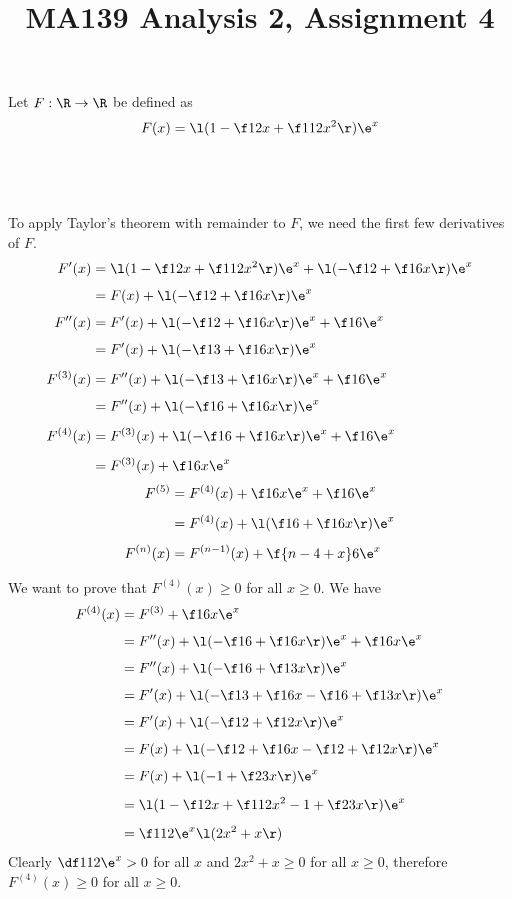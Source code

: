 \documentclass[a4paper]{article}
\title{MA139 Analysis 2, Assignment 4}
\begin{document}
\maketitle

\setlength{\parindent}{0em}
\setlength{\parskip}{1em}


Let $F : \R \to \R$ be defined as $$F(x) = \l( 1 - \f12 x + \f1{12} x^2 \r) \e^x$$

\subsection{~}

To apply Taylor's theorem with remainder to $F$, we need the first few derivatives of $F$. \begin{align*}
F'(x) &= \l( 1 - \f12 x + \f1{12} x^2 \r) \e^x + \l( - \f12 + \f16 x \r) \e^x\\[1ex]
&= F(x) + \l( - \f12 + \f16 x \r) \e^x\\[1ex]
F''(x) &= F'(x) + \l( - \f12 + \f16 x \r) \e^x + \f16 \e^x\\[1ex]
&= F'(x) + \l( - \f13 + \f16 x \r) \e^x\\[1ex]
F^{(3)}(x) &= F''(x) + \l( - \f13 + \f16 x \r) \e^x + \f16 \e^x\\[1ex]
&= F''(x) + \l( - \f16 + \f16 x \r) \e^x\\[1ex]
F^{(4)}(x) &= F^{(3)}(x) + \l( - \f16 + \f16 x \r) \e^x + \f16 \e^x\\[1ex]
&= F^{(3)}(x) + \f16 x \e^x
\end{align*}
\begin{align*}
F^{(5)} &= F^{(4)}(x) + \f16 x \e^x + \f16 \e^x\\[1ex]
&= F^{(4)}(x) + \l( \f16 + \f16 x \r) \e^x\\[1ex]
F^{(n)}(x) &= F^{(n-1)}(x) + \f{n - 4 + x}6 \e^x
\end{align*}

We want to prove that $F^{(4)}(x) \ge 0$ for all $x \ge 0$. We have \begin{align*}
F^{(4)}(x) &= F^{(3)} + \f16 x \e^x\\[1ex]
&= F''(x) + \l( - \f16 + \f16 x \r) \e^x + \f16 x \e^x\\[1ex]
&= F''(x) + \l( - \f16 + \f13 x \r) \e^x\\[1ex]
&= F'(x) + \l( - \f13 + \f16 x - \f16 + \f13 x \r) \e^x\\[1ex]
&= F'(x) + \l( - \f12 + \f12 x \r) \e^x\\[1ex]
&= F(x) + \l( - \f12 + \f16 x - \f12 + \f12 x \r) \e^x\\[1ex]
&= F(x) + \l( - 1 + \f23 x \r) \e^x\\[1ex]
&= \l( 1 - \f12 x + \f1{12} x^2 - 1 + \f23 x \r) \e^x\\[1ex]
&= \f1{12} \e^x \l( 2 x^2 + x \r)
\end{align*}
Clearly $\df1{12} \e^x > 0$ for all $x$ and $2 x^2 + x \ge 0$ for all $x \ge 0$, therefore $F^{(4)}(x) \ge 0$ for all $x \ge 0$.
\end{document}
